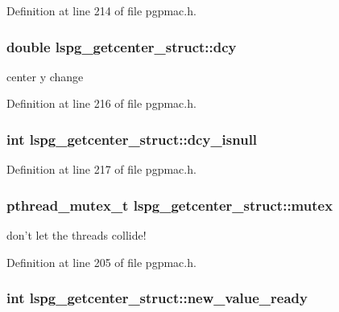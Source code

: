 Definition at line 214 of file pgpmac.\-h.

\hypertarget{structlspg__getcenter__struct_a55b1a488b714e6a40d8e06a6e182bd0a}{
\subsubsection[{dcy}]{\setlength{\rightskip}{0pt plus 5cm}double lspg\-\_\-getcenter\-\_\-struct\-::dcy}}\label{structlspg__getcenter__struct_a55b1a488b714e6a40d8e06a6e182bd0a}


center y change 



Definition at line 216 of file pgpmac.\-h.

\hypertarget{structlspg__getcenter__struct_a352c48c8d443c52f18ebd13019d01684}{
\subsubsection[{dcy\-\_\-isnull}]{\setlength{\rightskip}{0pt plus 5cm}int lspg\-\_\-getcenter\-\_\-struct\-::dcy\-\_\-isnull}}\label{structlspg__getcenter__struct_a352c48c8d443c52f18ebd13019d01684}


Definition at line 217 of file pgpmac.\-h.

\hypertarget{structlspg__getcenter__struct_a214bb7e88b137162f13f41f2c43002a9}{
\subsubsection[{mutex}]{\setlength{\rightskip}{0pt plus 5cm}pthread\-\_\-mutex\-\_\-t lspg\-\_\-getcenter\-\_\-struct\-::mutex}}\label{structlspg__getcenter__struct_a214bb7e88b137162f13f41f2c43002a9}


don't let the threads collide! 



Definition at line 205 of file pgpmac.\-h.

\hypertarget{structlspg__getcenter__struct_a4b350f11f1e375b9e9e839caaffbcb6b}{
\subsubsection[{new\-\_\-value\-\_\-ready}]{\setlength{\rightskip}{0pt plus 5cm}int lspg\-\_\-getcenter\-\_\-struct\-::new\-\_\-value\-\_\-ready}}\label{structlspg__getcenter__struct_a4b350f11f1e375b9e9e839caaffbcb6b}



